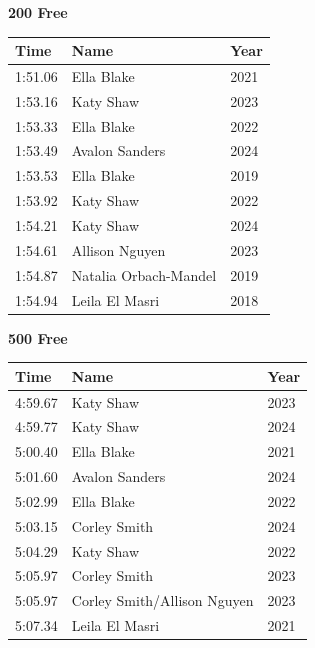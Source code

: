 \vspace{0.3em}
\vspace{1.2em}
\noindent\begin{minipage}[t]{0.48\textwidth}
\centering
\textbf{\textcolor{teamprimary}{200 Free}}\par
\vspace{0.5em}
\centering
\small
\renewcommand{\arraystretch}{1.0}
\setlength{\tabcolsep}{4pt}
\begin{tabular}{@{}p{1.8cm}p{3.0cm}p{1.0cm}@{}}
\toprule
\textbf{Time} & \textbf{Name} & \textbf{Year} \\
\midrule
1:51.06 & Ella Blake & 2021 \\
1:53.16 & Katy Shaw & 2023 \\
1:53.33 & Ella Blake & 2022 \\
1:53.49 & Avalon Sanders & 2024 \\
1:53.53 & Ella Blake & 2019 \\
1:53.92 & Katy Shaw & 2022 \\
1:54.21 & Katy Shaw & 2024 \\
1:54.61 & Allison Nguyen & 2023 \\
1:54.87 & Natalia Orbach-Mandel & 2019 \\
1:54.94 & Leila El Masri & 2018 \\
\bottomrule
\end{tabular}
\end{minipage}
\hfill
\begin{minipage}[t]{0.48\textwidth}
\centering
\textbf{\textcolor{teamprimary}{500 Free}}\par
\vspace{0.5em}
\centering
\small
\renewcommand{\arraystretch}{1.0}
\setlength{\tabcolsep}{4pt}
\begin{tabular}{@{}p{1.8cm}p{3.0cm}p{1.0cm}@{}}
\toprule
\textbf{Time} & \textbf{Name} & \textbf{Year} \\
\midrule
4:59.67 & Katy Shaw & 2023 \\
4:59.77 & Katy Shaw & 2024 \\
5:00.40 & Ella Blake & 2021 \\
5:01.60 & Avalon Sanders & 2024 \\
5:02.99 & Ella Blake & 2022 \\
5:03.15 & Corley Smith & 2024 \\
5:04.29 & Katy Shaw & 2022 \\
5:05.97 & Corley Smith & 2023 \\
5:05.97 & Corley Smith/Allison Nguyen & 2023 \\
5:07.34 & Leila El Masri & 2021 \\
\bottomrule
\end{tabular}
\end{minipage}
